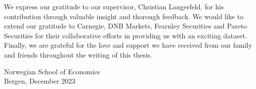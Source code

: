 \vspace*{2\baselineskip}

We express our gratitude to our supervisor, Christian Langerfeld, for his contribution through valuable insight and thorough feedback. We would like to extend our gratitude to Carnegie, DNB Markets, Fearnley Securities and Pareto Securities for their collaborative efforts in providing us with an exciting dataset. Finally, we are grateful for the love and support we have received from our family and friends throughout the writing of this thesis.



\vspace*{6\baselineskip}

\center Norwegian School of Economics\\

\center Bergen, December 2023
\vspace*{3\baselineskip}


\makeatletter
\newcommand*{\textoverline}[1]{$\overline{\hbox{#1}}\m@th$}
\makeatother



\makebox[2.5in]{\hrulefill}  \qquad \qquad \qquad \makebox[2.5in]{\hrulefill}

 \qquad \qquad \qquad  {}


